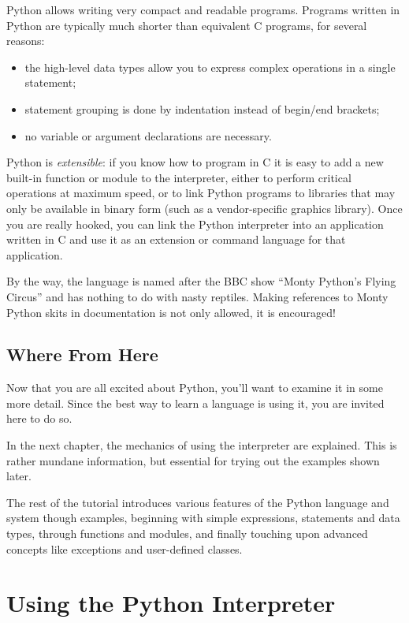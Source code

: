 \documentclass{manual}
\begin{document}
Python allows writing very compact and readable programs.  Programs
written in Python are typically much shorter than equivalent C
programs, for several reasons:
\begin{itemize}
\item
the high-level data types allow you to express complex operations in a
single statement;
\item
statement grouping is done by indentation instead of begin/end
brackets;
\item
no variable or argument declarations are necessary.
\end{itemize}

Python is \emph{extensible}: if you know how to program in C it is easy
to add a new built-in function or module to the interpreter, either to
perform critical operations at maximum speed, or to link Python
programs to libraries that may only be available in binary form (such
as a vendor-specific graphics library).  Once you are really hooked,
you can link the Python interpreter into an application written in C
and use it as an extension or command language for that application.

By the way, the language is named after the BBC show ``Monty Python's
Flying Circus'' and has nothing to do with nasty reptiles.  Making
references to Monty Python skits in documentation is not only allowed,
it is encouraged!

\section{Where From Here \label{where}}

Now that you are all excited about Python, you'll want to examine it
in some more detail.  Since the best way to learn a language is
using it, you are invited here to do so.

In the next chapter, the mechanics of using the interpreter are
explained.  This is rather mundane information, but essential for
trying out the examples shown later.

The rest of the tutorial introduces various features of the Python
language and system though examples, beginning with simple
expressions, statements and data types, through functions and modules,
and finally touching upon advanced concepts like exceptions
and user-defined classes.

\chapter{Using the Python Interpreter \label{using}}
\end{document}
